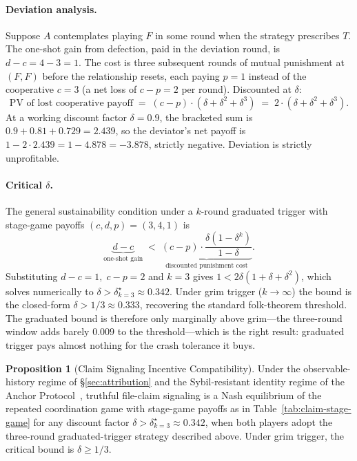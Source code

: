 \documentclass[11pt,a4paper]{article}
\theoremstyle{definition}
\newtheorem{proposition}{Proposition}[section]
\theoremstyle{remark}
\begin{document}
\paragraph{Deviation analysis.}
Suppose $A$ contemplates playing $F$ in some round when the strategy prescribes $T$. The one-shot gain from defection, paid in the deviation round, is $d - c = 4 - 3 = 1$. The cost is three subsequent rounds of mutual punishment at $(F,F)$ before the relationship resets, each paying $p = 1$ instead of the cooperative $c = 3$ (a net loss of $c - p = 2$ per round). Discounted at $\delta$:
\[
\text{PV of lost cooperative payoff} \;=\; (c - p) \cdot (\delta + \delta^2 + \delta^3) \;=\; 2 \cdot (\delta + \delta^2 + \delta^3).
\]
At a working discount factor $\delta = 0.9$, the bracketed sum is $0.9 + 0.81 + 0.729 = 2.439$, so the deviator's net payoff is $1 - 2 \cdot 2.439 = 1 - 4.878 = -3.878$, strictly negative. Deviation is strictly unprofitable.

\paragraph{Critical $\delta$.}
The general sustainability condition under a $k$-round graduated trigger with stage-game payoffs $(c, d, p) = (3, 4, 1)$ is
\[
\underbrace{d - c}_{\text{one-shot gain}} \;<\; \underbrace{(c - p) \cdot \frac{\delta(1 - \delta^k)}{1 - \delta}}_{\text{discounted punishment cost}}.
\]
Substituting $d - c = 1,\; c - p = 2$ and $k = 3$ gives $1 < 2\delta(1 + \delta + \delta^2)$, which solves numerically to $\delta > \delta^\star_{k=3} \approx 0.342$. Under grim trigger ($k \to \infty$) the bound is the closed-form $\delta > 1/3 \approx 0.333$, recovering the standard folk-theorem threshold. The graduated bound is therefore only marginally above grim---the three-round window adds barely $0.009$ to the threshold---which is the right result: graduated trigger pays almost nothing for the crash tolerance it buys.

\begin{proposition}[Claim Signaling Incentive Compatibility]\label{prop:claim-signaling-ic}
Under the observable-history regime of \S\ref{sec:attribution} and the Sybil-resistant identity regime of the Anchor Protocol~\cite{owens2026anchor}, truthful file-claim signaling is a Nash equilibrium of the repeated coordination game with stage-game payoffs as in Table~\ref{tab:claim-stage-game} for any discount factor $\delta > \delta^\star_{k=3} \approx 0.342$, when both players adopt the three-round graduated-trigger strategy described above. Under grim trigger, the critical bound is $\delta \ge 1/3$.
\end{proposition}
\end{document}
